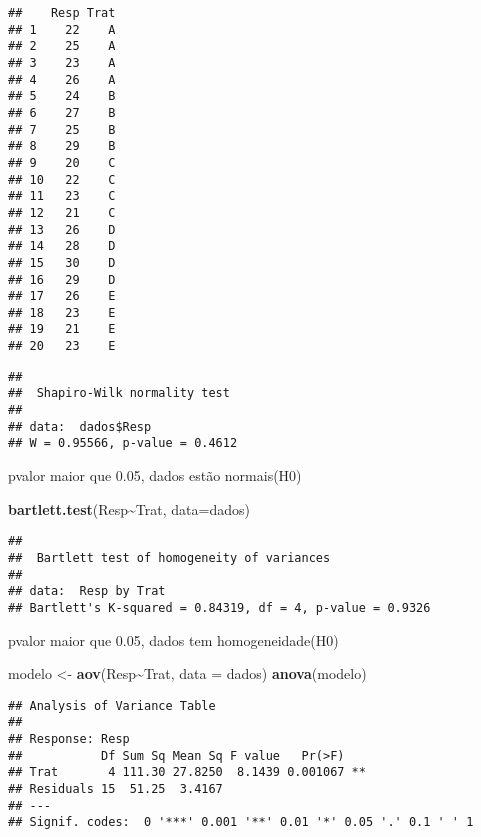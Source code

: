 \documentclass[
]{article}
\newenvironment{Shaded}{\begin{snugshade}}{\end{snugshade}}
\newcommand{\AttributeTok}[1]{\textcolor[rgb]{0.13,0.29,0.53}{#1}}
\newcommand{\FunctionTok}[1]{\textcolor[rgb]{0.13,0.29,0.53}{\textbf{#1}}}
\newcommand{\NormalTok}[1]{#1}
\newcommand{\OtherTok}[1]{\textcolor[rgb]{0.56,0.35,0.01}{#1}}
\newcommand{\SpecialCharTok}[1]{\textcolor[rgb]{0.81,0.36,0.00}{\textbf{#1}}}
\begin{document}
\begin{verbatim}
##    Resp Trat
## 1    22    A
## 2    25    A
## 3    23    A
## 4    26    A
## 5    24    B
## 6    27    B
## 7    25    B
## 8    29    B
## 9    20    C
## 10   22    C
## 11   23    C
## 12   21    C
## 13   26    D
## 14   28    D
## 15   30    D
## 16   29    D
## 17   26    E
## 18   23    E
## 19   21    E
## 20   23    E
\end{verbatim}

\begin{Shaded}
\end{Shaded}

\begin{verbatim}
## 
##  Shapiro-Wilk normality test
## 
## data:  dados$Resp
## W = 0.95566, p-value = 0.4612
\end{verbatim}

pvalor maior que 0.05, dados estão normais(H0)

\begin{Shaded}
\begin{Highlighting}[]
\FunctionTok{bartlett.test}\NormalTok{(Resp}\SpecialCharTok{\textasciitilde{}}\NormalTok{Trat, }\AttributeTok{data=}\NormalTok{dados)}
\end{Highlighting}
\end{Shaded}

\begin{verbatim}
## 
##  Bartlett test of homogeneity of variances
## 
## data:  Resp by Trat
## Bartlett's K-squared = 0.84319, df = 4, p-value = 0.9326
\end{verbatim}

pvalor maior que 0.05, dados tem homogeneidade(H0)

\begin{Shaded}
\begin{Highlighting}[]
\NormalTok{modelo }\OtherTok{\textless{}{-}} \FunctionTok{aov}\NormalTok{(Resp}\SpecialCharTok{\textasciitilde{}}\NormalTok{Trat, }\AttributeTok{data =}\NormalTok{ dados)}
\FunctionTok{anova}\NormalTok{(modelo) }
\end{Highlighting}
\end{Shaded}

\begin{verbatim}
## Analysis of Variance Table
## 
## Response: Resp
##           Df Sum Sq Mean Sq F value   Pr(>F)   
## Trat       4 111.30 27.8250  8.1439 0.001067 **
## Residuals 15  51.25  3.4167                    
## ---
## Signif. codes:  0 '***' 0.001 '**' 0.01 '*' 0.05 '.' 0.1 ' ' 1
\end{verbatim}
\end{document}
